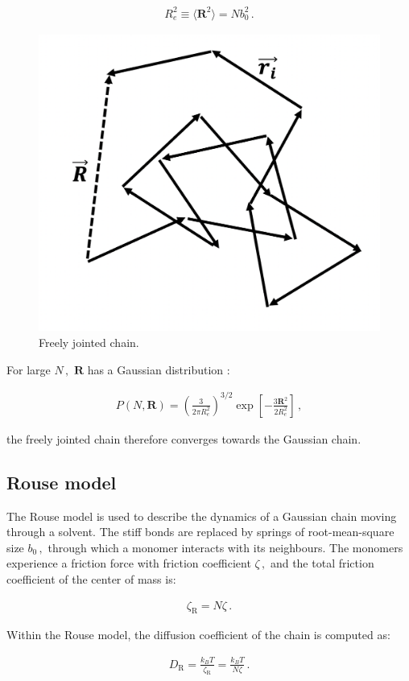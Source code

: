 \documentclass[bachelor,       %
               oneside,        %
               BCOR10mm,       %
               ngerman, english %
               ]{GAUBM}
\begin{document}
\begin{align}
    R_e^2\equiv \langle\mathbf R^2\rangle=Nb_0^2\,.
    \label{eq:Re}
\end{align}

\begin{figure}[h]
  \centering
  \includegraphics[width=0.5\linewidth]{figures/ideal_chain.png}
  \caption{Freely jointed chain.}
  \label{fig:ideal_chain}
\end{figure}

For large $N\,,$ $\mathbf R$ has a Gaussian distribution \cite{Rubin03}:
 
 
\begin{align}
    P(N,\mathbf R)=\left(\frac{3}{2\pi R_e^2}\right)^{3/2}\exp\left[-\frac{3\mathbf R^2}{2R_e^2}\right]\,,
\end{align}
 
 the freely jointed chain therefore converges towards the Gaussian chain. 
 
\subsection{Rouse model}

The Rouse model \cite{Rouse} is used to describe the dynamics of a Gaussian chain moving through a solvent. The stiff bonds are replaced by springs of root-mean-square size $b_0\,,$ through which a monomer interacts with its neighbours. The monomers experience a friction force with friction coefficient  $\zeta\,,$ and the total friction coefficient of the center of mass is:

\begin{align}
    \zeta_\mathrm R=N\zeta\,.
\end{align}

Within the Rouse model, the diffusion coefficient of the chain is computed as:

\begin{align}
    D_\mathrm R=\frac{k_BT}{\zeta_\mathrm R}=\frac{k_BT}{N\zeta}\,.
    \label{eq:d_rouse}
\end{align}
\end{document}
